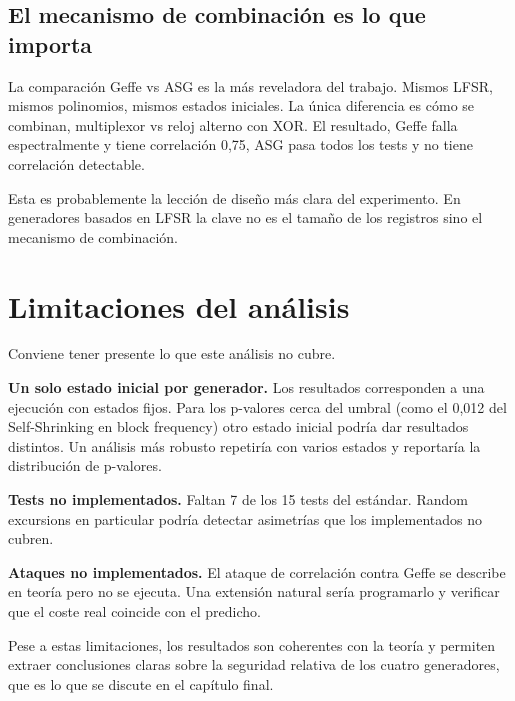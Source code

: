 \subsection{El mecanismo de combinación es lo que importa}

La comparación Geffe vs ASG es la más reveladora del trabajo. Mismos LFSR, mismos polinomios, mismos estados iniciales.
La única diferencia es cómo se combinan, multiplexor vs reloj alterno con XOR.
El resultado, Geffe falla espectralmente y tiene correlación 0,75, ASG pasa todos los tests y no tiene correlación detectable.

Esta es probablemente la lección de diseño más clara del experimento.
En generadores basados en LFSR la clave no es el tamaño de los registros sino el mecanismo de combinación.

\section{Limitaciones del análisis}

Conviene tener presente lo que este análisis no cubre.

\textbf{Un solo estado inicial por generador.} Los resultados corresponden a una ejecución
con estados fijos. Para los p-valores cerca del umbral (como el 0,012 del Self-Shrinking en block frequency)
otro estado inicial podría dar resultados distintos. Un análisis más robusto repetiría con varios estados
y reportaría la distribución de p-valores.

\textbf{Tests no implementados.} Faltan 7 de los 15 tests del estándar.
Random excursions en particular podría detectar asimetrías que los implementados no cubren.

\textbf{Ataques no implementados.} El ataque de correlación contra Geffe se describe en teoría
pero no se ejecuta. Una extensión natural sería programarlo y verificar
que el coste real coincide con el predicho.

Pese a estas limitaciones, los resultados son coherentes con la teoría y permiten extraer conclusiones claras sobre la seguridad relativa de los cuatro generadores,
que es lo que se discute en el capítulo final.
